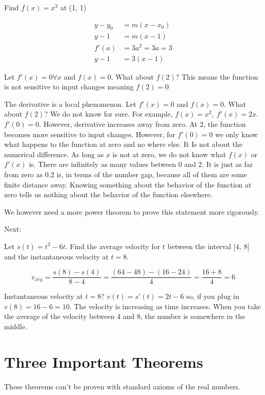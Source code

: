 \documentclass[12pt]{article}
\theoremstyle{plain}
\theoremstyle{remark}
\theoremstyle{definition}
\begin{document}
Find \(f(x) = x^{3}\) at (1, 1)

\begin{align*}
y - y_{0} &= m\left( x - x_{0} \right) \\
y - 1 &= m(x - 1) \\
f'(a) &= 3a^{2} = 3a = 3 \\
y - 1 &= 3(x - 1)
\end{align*}


Let \(f'(x) = 0\forall x\) and \(f(x) = 0\). What about \(f(2)\)?
This means the function is not sensitive to input changes meaning
\(f(2) = 0\)

The derivative is a local phenomenon. Let \(f'(x) = 0\) and
\(f(x) = 0\). What about \(f(2)\)? We do not know for sure. For example,
\(f(x) = x^{2},\ f'(x) = 2x\). \(f'(0) = 0\). However, derivative
increases away from zero. At 2, the function becomes more sensitive to
input changes. However, for \(f'(0) = 0\) we only know what happens
to the function at zero and no where else. It Is not about the numerical
difference. As long as \(x\) is not at zero, we do not know what
\(f(x)\) or \(f'(x)\) is. There are infinitely as many values between 0
and 2. It is just as far from zero as 0.2 is, in terms of the number
gap, because all of them are some finite distance away. Knowing
something about the behavior of the function at zero tells us nothing
about the behavior of the function elsewhere.

We however need a more power theorem to prove this statement more
rigorously.

Next:

Let \(s(t) = t^{2} - 6t\). Find the average velocity for \(t\) between
the interval \(\lbrack 4,\ 8\rbrack\) and the instantaneous velocity at
\(t = 8\).

\[v_{\text{avg}} = \frac{s(8) - s(4)}{8 - 4} = \frac{(64 - 48) - (16 - 24)}{4} = \frac{16 + 8}{4} = 6\]

Instantaneous velocity at \(t = 8\)? \(v(t) = s'(t) = 2t - 6\) so, if
you plug in \(v(8) = 16 - 6 = 10\). The velocity is increasing as time
increases. When you take the average of the velocity between 4 and 8,
the number is somewhere in the middle.


\section{Three Important Theorems}

These theorems can't be proven with standard axioms of the real numbers.
\end{document}
